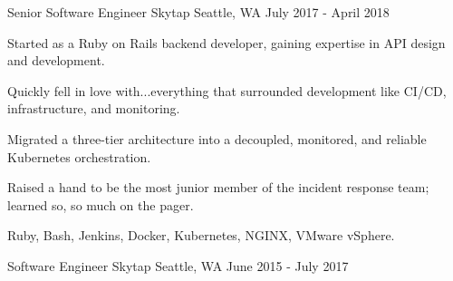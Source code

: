 \begin{cventries}
  \cventry
    {Senior Software Engineer} %
    {Skytap} %
    {Seattle, WA} %
    {July 2017 - April 2018} %
    {
      \begin{cvitems} %
        \item {Started as a Ruby on Rails backend developer, gaining expertise in API design and development.}
        \item {Quickly fell in love with...everything that surrounded development like CI/CD, infrastructure, and monitoring.}
        \item {Migrated a three-tier architecture into a decoupled, monitored, and reliable Kubernetes orchestration.}
        \item {Raised a hand to be the most junior member of the incident response team; learned so, so much on the pager.}
        \item {Ruby, Bash, Jenkins, Docker, Kubernetes, NGINX, VMware vSphere.}
      \end{cvitems}
    }

  \cventry
    {Software Engineer} %
    {Skytap} %
    {Seattle, WA} %
    {June 2015 - July 2017} %
    {}

\end{cventries}
